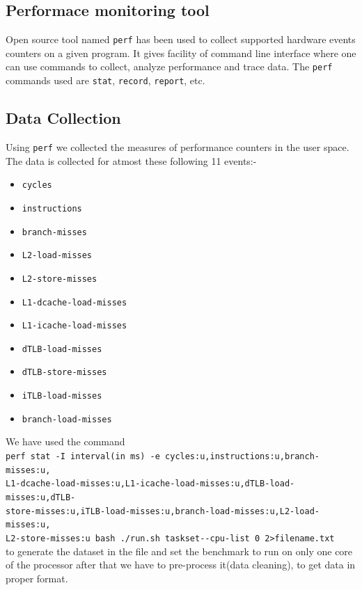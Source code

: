 \documentclass[10pt, letterpaper, IEEEtran, tikz,border=5,a4paper,fleqn]{article}
\begin{document}
\subsection{Performace monitoring tool}

Open source tool named \verb|perf| has been used to collect supported hardware events counters on a given program. It gives facility of command line interface where one can use commands to collect, analyze performance and trace data. The \verb|perf| commands used are \verb|stat|, \verb|record|, \verb|report|, etc.

\subsection{Data Collection}

Using \verb|perf| we collected the measures of performance counters in the user space. The data is collected for atmost these following 11 events:-
\begin{multicols}{3}
\begin{itemize}
    \item \verb|cycles|
    \item \verb|instructions|
    \item \verb|branch-misses|
    \item \verb|L2-load-misses|
\end{itemize}
\columnbreak
\begin{itemize}
    \item \verb|L2-store-misses|
    \item \verb|L1-dcache-load-misses|
    \item \verb|L1-icache-load-misses|
    \item \verb|dTLB-load-misses|
\end{itemize}
\columnbreak
\begin{itemize}
    \item \verb|dTLB-store-misses|
    \item \verb|iTLB-load-misses|
    \item \verb|branch-load-misses|
\end{itemize}
\end{multicols}

\noindent We have used the command \\
\indent \verb|perf stat -I interval(in ms) -e cycles:u,instructions:u,branch-misses:u,|\\ \indent \verb|L1-dcache-load-misses:u,L1-icache-load-misses:u,dTLB-load-misses:u,dTLB-|\\ \indent \verb|store-misses:u,iTLB-load-misses:u,branch-load-misses:u,L2-load-misses:u,|\\ \indent \verb|L2-store-misses:u bash ./run.sh taskset--cpu-list 0 2>filename.txt|\\
to generate the dataset in the file and set the benchmark to run on only one core of the processor after that we have to pre-process it(data cleaning), to get data in proper format.
\end{document}
